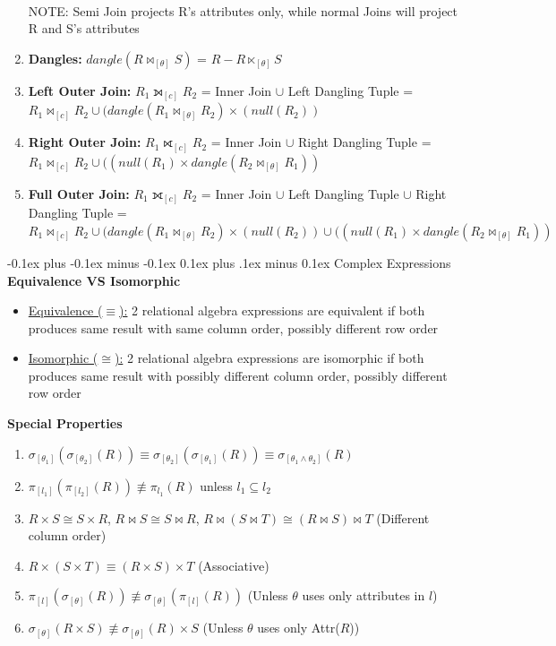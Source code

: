 \documentclass[landscape]{article}
\makeatletter
\renewcommand{\subsection}{\@startsection{subsection}{2}{0mm}%
  {-0.1ex plus -0.1ex minus -0.1ex}%
  {0.1ex plus .1ex minus 0.1ex}%
{\normalfont\scriptsize\bfseries}}
\makeatother
\begin{document}
\begin{multicols*}{5}
\begin{enumerate}
      \\ NOTE: Semi Join projects R's attributes only, while normal Joins will project R and S's attributes
      \item \textbf{Dangles:} $dangle(R \Join_{[\theta]}S)$ = $R - R \ltimes_{[\theta]}S$
      \item \textbf{Left Outer Join:} $R_1 \leftouterjoin_{[c]}R_2$ = Inner Join $\cup$ Left Dangling Tuple = $R_1 \Join_{[c]} R_2 \cup (dangle(R_1 \Join_{[\theta]}R_2) \times (null(R_2))$
      \item \textbf{Right Outer Join:} $R_1 \rightouterjoin_{[c]}R_2$ = Inner Join $\cup$ Right Dangling Tuple = $R_1 \Join_{[c]} R_2 \cup ((null(R_1) \times dangle(R_2 \Join_{[\theta]}R_1))$
      \item \textbf{Full Outer Join:} $R_1 \fullouterjoin_{[c]}R_2$ = Inner Join $\cup$ Left Dangling Tuple $\cup$ Right Dangling Tuple = $R_1 \Join_{[c]} R_2 \cup (dangle(R_1 \Join_{[\theta]}R_2) \times (null(R_2)) \cup ((null(R_1) \times dangle(R_2 \Join_{[\theta]}R_1))$
    \end{enumerate}

    \subsection{Complex Expressions}
    \textbf{Equivalence VS Isomorphic}
    \begin{itemize}
      \item \underline{Equivalence ($\equiv$):} 2 relational algebra expressions are equivalent if both produces same result with same column order, possibly different row order
      \item \underline{Isomorphic ($\cong$):} 2 relational algebra expressions are isomorphic if both produces same result with possibly different column order, possibly different row order
    \end{itemize}
    \textbf{Special Properties}
    \begin{enumerate}
      \item $\sigma_{[\theta_1]}(\sigma_{[\theta_2]}(R)) \equiv \sigma_{[\theta_2]}(\sigma_{[\theta_1]}(R)) \equiv \sigma_{[\theta_1 \wedge \theta_2]}(R)$
      \item $\pi_{[l_1]}(\pi_{[l_2]}(R)) \nequiv \pi_{l_1}(R)$ unless $l_1 \subseteq l_2$
      \item $R \times S \cong S \times R$, $R \Join S \cong S \Join R$, $R \Join (S \Join T) \cong (R \Join S) \Join T$ (Different column order)
      \item $R \times (S \times T) \equiv (R \times S) \times T$ (Associative)
      \item $\pi_{[l]}(\sigma_{[\theta]}(R)) \nequiv \sigma_{[\theta]}(\pi_{[l]}(R))$ (Unless $\theta$ uses only attributes in $l$)
      \item $\sigma_{[\theta]}(R \times S) \nequiv \sigma_{[\theta]}(R) \times S$ (Unless $\theta$ uses only Attr($R$))
    \end{enumerate}


\end{multicols*}
\end{document}
